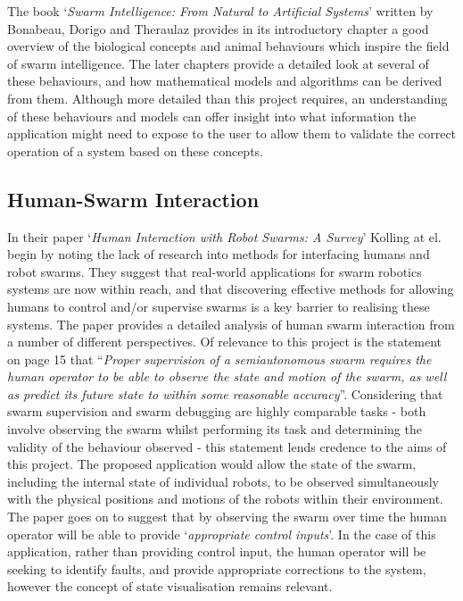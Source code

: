 \documentclass[titlepage,hidelinks,10pt]{article}
\begin{document}
The book `\textit{Swarm Intelligence: From Natural to Artificial Systems}' written by Bonabeau, Dorigo and Theraulaz\cite{FromNaturaltoArtificial} provides in its introductory chapter a good overview of the biological concepts and animal behaviours which inspire the field of swarm intelligence. The later chapters provide a detailed look at several of these behaviours, and how mathematical models and algorithms can be derived from them. Although more detailed than this project requires, an understanding of these behaviours and models can offer insight into what information the application might need to expose to the user to allow them to validate the correct operation of a system based on these concepts. 

\subsection{Human-Swarm Interaction} \label{HumanSwarmInteraction}
In their paper `\textit{Human Interaction with Robot Swarms: A Survey}'\cite{HumanSwarmInteractionSurvey} Kolling at el. begin by noting the lack of research into methods for interfacing humans and robot swarms. They suggest that real-world applications for swarm robotics systems are now within reach, and that discovering effective methods for allowing humans to control and/or supervise swarms is a key barrier to realising these systems. The paper\cite{HumanSwarmInteractionSurvey} provides a detailed analysis of human swarm interaction from a number of different perspectives. Of relevance to this project is the statement on page 15 that ``\textit{Proper supervision of a semiautonomous swarm requires the human operator to be able to observe the state and motion of the swarm, as well as predict its future state to within some reasonable accuracy}''. Considering that swarm supervision and swarm debugging are highly comparable tasks - both involve observing the swarm whilst performing its task and determining the validity of the behaviour observed  - this statement lends credence to the aims of this project. The proposed application would allow the state of the swarm, including the internal state of individual robots, to be observed simultaneously with the physical positions and motions of the robots within their environment. The paper\cite{HumanSwarmInteractionSurvey} goes on to suggest that by observing the swarm over time the human operator will be able to provide `\textit{appropriate control inputs}'. In the case of this application, rather than providing control input, the human operator will be seeking to identify faults, and provide appropriate corrections to the system, however the concept of state visualisation remains relevant.
\end{document}
